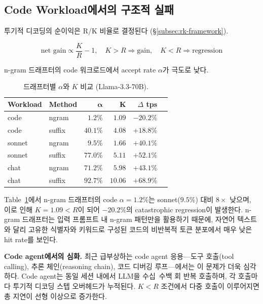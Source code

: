\subsection{Code Workload에서의 구조적 실패}
\label{subsec:mot-code-fail}

투기적 디코딩의 순이익은 R/K 비율로 결정된다
(\S\ref{subsec:rk-framework}).

\begin{equation}
\text{net gain} \propto \frac{K}{R} - 1, \quad K > R \Rightarrow \text{gain},
\quad K < R \Rightarrow \text{regression}
\label{eq:rk-condition}
\end{equation}

n-gram 드래프터의 code 워크로드에서 accept rate $\alpha$가 극도로 낮다.

\begin{table}[t]
\centering
\caption{드래프터별 $\alpha$와 $K$ 비교 (Llama-3.3-70B).}
\label{tbl:alpha-k}
\footnotesize
\begin{tabular}{@{}llrrrr@{}}
\toprule
\textbf{Workload} & \textbf{Method} & $\boldsymbol{\alpha}$ & $\boldsymbol{K}$ & \textbf{$\Delta$ tps} \\
\midrule
code & ngram   & $1.2\%$  & $1.09$ & $\mathbf{-20.2\%}$ \\
code & suffix  & $40.1\%$ & $4.08$ & $+18.8\%$ \\
\midrule
sonnet & ngram  & $9.5\%$  & $1.66$ & $+40.1\%$ \\
sonnet & suffix & $77.0\%$ & $5.11$ & $+52.1\%$ \\
\midrule
chat   & ngram  & $71.2\%$ & $5.98$ & $+43.1\%$ \\
chat   & suffix & $92.7\%$ & $10.06$ & $+68.9\%$ \\
\bottomrule
\end{tabular}
\end{table}

Table~\ref{tbl:alpha-k}에서 n-gram 드래프터의 code $\alpha = 1.2\%$는
sonnet($9.5\%$) 대비 $8\times$ 낮으며, 이로 인해 $K = 1.09 < R$이 되어
$-20.2\%$의 catastrophic regression이 발생한다.
n-gram 드래프터는 입력 프롬프트 내 n-gram 패턴만을 활용하기 때문에,
자연어 텍스트와 달리 고유한 식별자와 키워드로 구성된 코드의
비반복적 토큰 분포에서 매우 낮은 hit rate를 보인다.

\textbf{Code agent에서의 심화.}
최근 급부상하는 code agent 응용---도구 호출(tool calling),
추론 체인(reasoning chain), 코드 디버깅 루프---에서는 이 문제가 더욱 심각하다.
Code agent는 동일 세션 내에서 LLM을 수십~수백 회 반복 호출하며,
각 호출마다 투기적 디코딩 스텝 오버헤드가 누적된다.
$K < R$ 조건에서 다중 호출이 이루어지면 총 지연이 선형 이상으로 증가한다.

